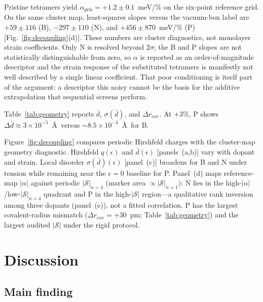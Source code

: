 \documentclass[%
 reprint,
 groupedaddress,
 amsmath,amssymb,
 aps,
 prb,
 floatfix,
]{revtex4-2}
\begin{document}
Pristine tetramers yield $\alpha_{\mathrm{pris}}=+1.2\pm 0.1$~meV/\% on the six-point reference grid.
On the same cluster map, least-squares slopes versus the vacuum-box label are $+59\pm 116$ (B), $-297\pm 110$ (N), and $+456\pm 870$~meV/\% (P) [Fig.~\ref{fig:decoupling}(d)]. These numbers are cluster diagnostics, not monolayer strain coefficients.
Only N is resolved beyond $2\sigma$; the B and P slopes are not statistically distinguishable from zero, so $\alpha$ is reported as an order-of-magnitude descriptor and the strain response of the substituted tetramers is manifestly not well described by a single linear coefficient.
That poor conditioning is itself part of the argument: a descriptor this noisy cannot be the basis for the additive extrapolation that sequential screens perform.

Table~\ref{tab:geometry} reports $\bar{d}$, $\sigma(\bar{d})$, and $\Delta r_{\mathrm{cov}}$.
At $+3$\%, P shows $\Delta\bar{d}\approx 3\times 10^{-5}$~\AA\ versus ${\sim}8.5\times 10^{-3}$~\AA\ for B.


Figure~\ref{fig:decoupling} compares periodic Hirshfeld charges with the cluster-map geometry diagnostic.
Hirshfeld $q(\epsilon)$ and $\bar{d}(\epsilon)$ [panels~(a,b)] vary with dopant and strain.
Local disorder $\sigma(\bar{d})(\epsilon)$ [panel~(c)] broadens for B and N under tension while remaining near the $\epsilon{=}0$ baseline for P.
Panel~(d) maps reference-map $|\alpha|$ against periodic $|\mathcal{S}|_{n=4}$ (marker area $\propto|\mathcal{S}|_{n=1}$): N lies in the high-$|\alpha|$/low-$|\mathcal{S}|_{n=4}$ quadrant and P in the high-$|\mathcal{S}|$ region---a qualitative rank inversion among three dopants (panel~(e)), not a fitted correlation.
P has the largest covalent-radius mismatch ($\Delta r_{\mathrm{cov}}{=}+30$~pm; Table~\ref{tab:geometry}) and the largest audited $|\mathcal{S}|$ under the rigid protocol.

\section{\label{sec:discussion}Discussion}

\subsection{Main finding}
\label{sec:discussion_main}
\end{document}
